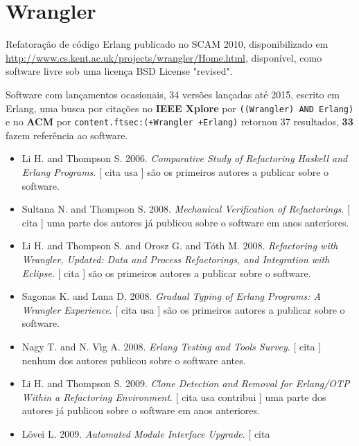 \section{Wrangler}

Refatoração de código Erlang
publicado no SCAM 2010,
disponibilizado em \url{http://www.cs.kent.ac.uk/projects/wrangler/Home.html},
disponível,
como software livre
sob uma licença BSD License "revised".

Software com lançamentos ocasionais,
34 versões lançadas
até 2015,
escrito em Erlang,
uma busca por citações no {\bf IEEE Xplore} por
\texttt{((Wrangler) AND Erlang)}
e no {\bf ACM} por
\texttt{content.ftsec:(+Wrangler +Erlang)}
retornou
37 resultados,
{\bf 33} fazem referência ao software.

\begin{itemize}
\item Li H. and Thompson S.
      2006.
        \textit{ Comparative Study of Refactoring Haskell and Erlang Programs}.
      [
          cita
          usa
      ]
são os primeiros autores a publicar sobre o software.
\item Sultana N. and Thompson S.
      2008.
        \textit{ Mechanical Verification of Refactorings}.
      [
          cita
      ]
uma parte dos autores já publicou sobre o software em anos anteriores.
\item Li H. and Thompson S. and Orosz G. and T\'{o}th M.
      2008.
        \textit{ Refactoring with Wrangler, Updated: Data and Process Refactorings, and Integration with Eclipse}.
      [
          cita
      ]
são os primeiros autores a publicar sobre o software.
\item Sagonas K. and Luna D.
      2008.
        \textit{ Gradual Typing of Erlang Programs: A Wrangler Experience}.
      [
          cita
          usa
      ]
são os primeiros autores a publicar sobre o software.
\item Nagy T. and N. V\'{\i}g A.
      2008.
        \textit{ Erlang Testing and Tools Survey}.
      [
          cita
      ]
nenhum dos autores publicou sobre o software antes.
\item Li H. and Thompson S.
      2009.
        \textit{ Clone Detection and Removal for Erlang/OTP Within a Refactoring Environment}.
      [
          cita
          usa
          contribui
      ]
uma parte dos autores já publicou sobre o software em anos anteriores.
\item L\"{o}vei L.
      2009.
        \textit{ Automated Module Interface Upgrade}.
      [
          cita

\end{itemize}
